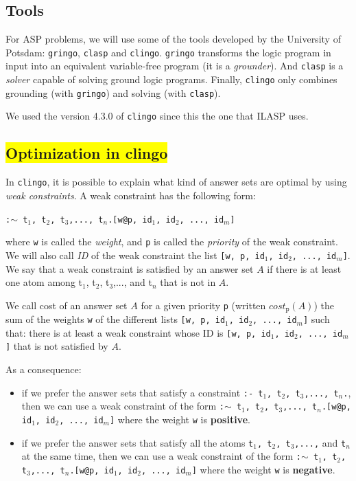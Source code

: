 \subsection{Tools}

For ASP problems, we will use some of the tools developed by the University of Potsdam: \texttt{gringo}, \texttt{clasp} and \texttt{clingo}. \texttt{gringo} transforms the logic program in input into an equivalent variable-free program (it is a \textit{grounder}). And \texttt{clasp} is a \textit{solver} capable of solving ground logic programs. Finally, \texttt{clingo} only combines grounding (with \texttt{gringo}) and solving (with \texttt{clasp}).

\smallskip

We used the version 4.3.0 of \texttt{clingo} since this the one that ILASP uses.

\subsection{\colorbox{yellow}{Optimization in clingo}}

In \texttt{clingo}, it is possible to explain what kind of answer sets are optimal by using \textit{weak constraints}. A weak constraint has the following form:
\begin{center}
\texttt{:$\sim$ t$_1$, t$_2$, t$_3$,..., t$_n$.[w@p, id$_1$, id$_2$, ..., id$_m$]}
\end{center}
where \texttt{w} is called the \textit{weight}, and \texttt{p} is called the \textit{priority} of the weak constraint. We will also call \textit{ID} of the weak constraint the list \texttt{[\texttt{w}, \texttt{p}, id$_1$, id$_2$, ..., id$_m$]}. We say that a weak constraint is satisfied by an answer set $A$ if there is at least one atom among t$_1$, t$_2$, t$_3$,..., and t$_n$ that is not in $A$.

\smallskip

We call cost of an answer set $A$ for a given priority \texttt{p} (written $cost_{\texttt{p}}(A)$) the sum of the weights \texttt{w} of the different lists \texttt{[\texttt{w}, \texttt{p}, id$_1$, id$_2$, ..., id$_m$]} such that: there is at least a weak constraint whose ID is  \texttt{[\texttt{w}, \texttt{p}, id$_1$, id$_2$, ..., id$_m$]} that is not satisfied by $A$.

\bigskip

As a consequence:
\begin{itemize}
\item if we prefer the answer sets that satisfy a constraint \texttt{:- t$_1$, t$_2$, t$_3$,..., t$_n$.}, then we can use a weak constraint of the form \texttt{:$\sim$ t$_1$, t$_2$, t$_3$,..., t$_n$.[w@p, id$_1$, id$_2$, ..., id$_m$]} where the weight \texttt{w} is \textbf{positive}.
\item if we prefer the answer sets that satisfy all the atoms \texttt{t$_1$, t$_2$, t$_3$,...,} and \texttt{t$_n$} at the same time, then we can use a weak constraint of the form \texttt{:$\sim$ t$_1$, t$_2$, t$_3$,..., t$_n$.[w@p, id$_1$, id$_2$, ..., id$_m$]} where the weight \texttt{w} is \textbf{negative}.
\end{itemize}

